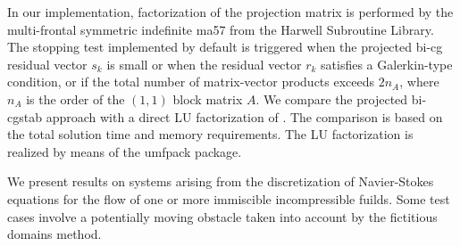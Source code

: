\documentclass{report}
\begin{document}
In our implementation, factorization of the projection matrix is performed by the
multi-frontal symmetric indefinite {\sc ma57} from the Harwell Subroutine
Library. The stopping test implemented by default is triggered when the
projected {\sc b}i-{\sc cg} residual vector $s_k$ is small or when the residual
vector $r_k$ satisfies a Galerkin-type condition, or if the total number of
matrix-vector products exceeds $2 n_A$, where $n_A$ is the order of the $(1,1)$
block matrix $A$. We compare the projected {\sc b}i-{\sc cgstab} approach with
a direct LU factorization of . The comparison is based on the
total solution time and memory requirements. The LU factorization is realized
by means of the {\sc umfpack} package.

We present results on systems arising from the discretization of
Navier-Stokes equations for the flow of one or more immiscible
incompressible fuilds. Some test cases involve a potentially moving
obstacle taken into account by the fictitious domains method.
\end{document}
